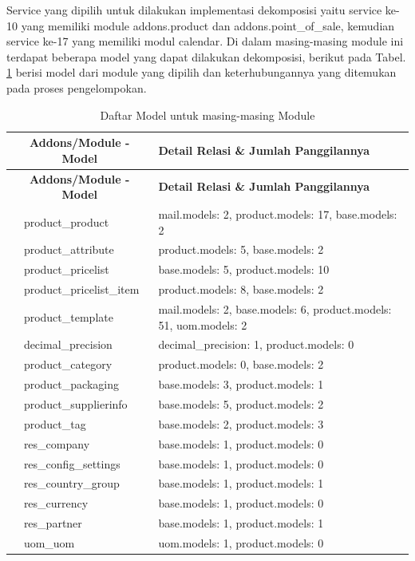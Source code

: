 Service yang dipilih untuk dilakukan implementasi dekomposisi yaitu  service ke-10  yang memiliki module addons.product dan addons.point{\_}of{\_}sale,  kemudian service ke-17 yang memiliki modul calendar. Di dalam masing-masing module ini terdapat beberapa model yang dapat dilakukan dekomposisi, berikut pada Tabel. \ref{tab:detail_model} berisi model dari module yang dipilih dan keterhubungannya yang ditemukan pada proses pengelompokan.

\begin{longtable}{|c|p{4cm}|p{7cm}|}
	\caption{Daftar Model untuk masing-masing Module}
	\label{tab:detail_model}\\
	\hline
	\multicolumn{2}{|c|}{\textbf{Addons/Module - Model}} &  \textbf{Detail Relasi \& Jumlah Panggilannya}\\
	\hline
	\endfirsthead
	\hline
	\multicolumn{2}{|c|}{\textbf{Addons/Module - Model}} & \textbf{Detail Relasi \& Jumlah Panggilannya}\\
	\hline
	\endhead
	\hline
	\endfoot
	\hline
	\endlastfoot

	\multirow{16}{*}{product.models} &  product{\_}product &  mail.models: 2, product.models: 17, base.models: 2 \\ \cline{2-3}  &  product{\_}attribute &  product.models: 5, base.models: 2 \\ \cline{2-3}  &  product{\_}pricelist &  base.models: 5, product.models: 10 \\ \cline{2-3}  &  product{\_}pricelist{\_}item &  product.models: 8, base.models: 2 \\ \cline{2-3}  &  product{\_}template &  mail.models: 2, base.models: 6, product.models: 51, uom.models: 2 \\ \cline{2-3}  &  decimal{\_}precision &  decimal{\_}precision: 1, product.models: 0 \\ \cline{2-3}  &  product{\_}category &  product.models: 0, base.models: 2 \\ \cline{2-3}  &  product{\_}packaging &  base.models: 3, product.models: 1 \\ \cline{2-3}  &  product{\_}supplierinfo &  base.models: 5, product.models: 2 \\ \cline{2-3}  &  product{\_}tag &  base.models: 2, product.models: 3 \\ \cline{2-3}  &  res{\_}company &  base.models: 1, product.models: 0 \\ \cline{2-3}  &  res{\_}config{\_}settings &  base.models: 1, product.models: 0 \\ \cline{2-3}  &  res{\_}country{\_}group &  base.models: 1, product.models: 1 \\ \cline{2-3}  &  res{\_}currency &  base.models: 1, product.models: 0 \\ \cline{2-3}  &  res{\_}partner &  base.models: 1, product.models: 1 \\ \cline{2-3}  &  uom{\_}uom &  uom.models: 1, product.models: 0 \\


\end{longtable}
